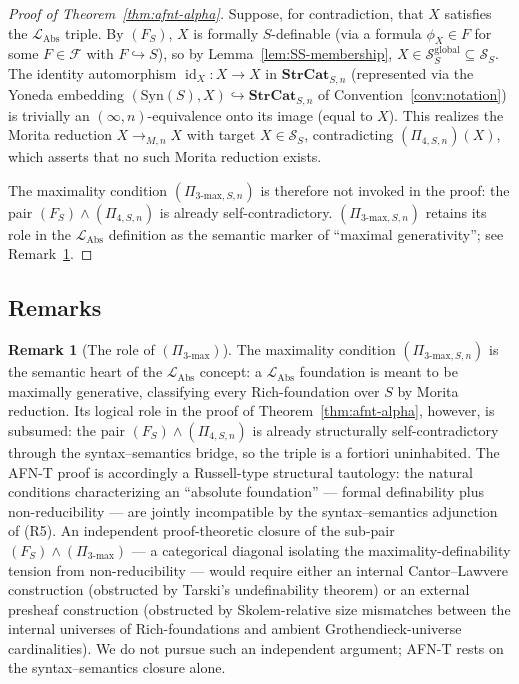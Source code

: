 \documentclass[11pt]{article}
\theoremstyle{plain}
\theoremstyle{definition}
\newtheorem{remark}[theorem]{Remark}
\newcommand{\cS}{\mathcal{S}}
\newcommand{\cF}{\mathcal{F}}
\newcommand{\LAbs}{\mathcal{L}_{\mathrm{Abs}}}
\newcommand{\Syn}{\mathrm{Syn}}
\DeclareMathOperator{\id}{id}
\begin{document}
\begin{proof}[Proof of Theorem~\ref{thm:afnt-alpha}]
Suppose, for contradiction, that $X$ satisfies the $\LAbs$ triple. By $(F_S)$, $X$ is formally $S$-definable (via a formula $\phi_X \in F$ for some $F \in \cF$ with $F \hookrightarrow S$), so by Lemma~\ref{lem:SS-membership}, $X \in \cS_S^{\mathrm{global}} \subseteq \cS_S$. The identity automorphism $\id_X : X \to X$ in $\mathbf{StrCat}_{S, n}$ (represented via the Yoneda embedding $(\Syn(S), X) \hookrightarrow \mathbf{StrCat}_{S, n}$ of Convention~\ref{conv:notation}) is trivially an $(\infty, n)$-equivalence onto its image (equal to $X$). This realizes the Morita reduction $X \to_{M, n} X$ with target $X \in \cS_S$, contradicting $(\Pi_{4, S, n})(X)$, which asserts that no such Morita reduction exists.

The maximality condition $(\Pi_{3\text{-max}, S, n})$ is therefore not invoked in the proof: the pair $(F_S) \wedge (\Pi_{4, S, n})$ is already self-contradictory. $(\Pi_{3\text{-max}, S, n})$ retains its role in the $\LAbs$ definition as the semantic marker of ``maximal generativity''; see Remark~\ref{rem:max-generativity-role}.
\end{proof}

\subsection{Remarks}

\begin{remark}[The role of $(\Pi_{3\text{-max}})$]\label{rem:max-generativity-role}
The maximality condition $(\Pi_{3\text{-max}, S, n})$ is the semantic heart of the $\LAbs$ concept: a $\LAbs$ foundation is meant to be maximally generative, classifying every Rich-foundation over $S$ by Morita reduction. Its logical role in the proof of Theorem~\ref{thm:afnt-alpha}, however, is subsumed: the pair $(F_S) \wedge (\Pi_{4, S, n})$ is already structurally self-contradictory through the syntax--semantics bridge, so the triple is a fortiori uninhabited. The AFN-T proof is accordingly a Russell-type structural tautology: the natural conditions characterizing an ``absolute foundation'' --- formal definability plus non-reducibility --- are jointly incompatible by the syntax--semantics adjunction of (R5). An independent proof-theoretic closure of the sub-pair $(F_S) \wedge (\Pi_{3\text{-max}})$ --- a categorical diagonal isolating the maximality-definability tension from non-reducibility --- would require either an internal Cantor--Lawvere construction (obstructed by Tarski's undefinability theorem) or an external presheaf construction (obstructed by Skolem-relative size mismatches between the internal universes of Rich-foundations and ambient Grothendieck-universe cardinalities). We do not pursue such an independent argument; AFN-T rests on the syntax--semantics closure alone.
\end{remark}
\end{document}
